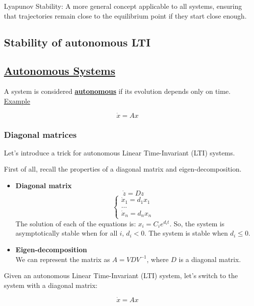 Lyapunov Stability: A more general concept applicable to all systems, ensuring that trajectories remain close to the equilibrium point if they start close enough.



\subsection{Stability of autonomous LTI}

\subsection*{\underline{Autonomous Systems}}

A system is considered \underline{\textbf{autonomous}} if its evolution depends only on time.\\

\underline{Example}

\[
\dot{x} = Ax
\]

\subsubsection{Diagonal matrices}

Let's introduce a trick for autonomous Linear Time-Invariant (LTI) systems.

First of all, recall the properties of a diagonal matrix and eigen-decomposition.
\begin{itemize}
    \item \textbf{Diagonal matrix}
        \[\dot{z} = Dz\]
        \[
        \begin{cases}
            \dot{x}_1 = d_1 x_1 \\
            \dots \\
            \dot{x}_n = d_n x_n
        \end{cases}
        \]
        The solution of each of the equations is: \(x_i = C_i e^{d_i t}\).
        So, the system is asymptotically stable when for all \(i\), \(d_i < 0\). 
        The system is stable when \(d_i \leq 0\).
    \item \textbf{Eigen-decomposition}\\
        We can represent the matrix as \(A = VDV^{-1}\), where \(D\) is a diagonal matrix.
\end{itemize}

Given an autonomous Linear Time-Invariant (LTI) system, let's switch to the system with a diagonal matrix:

\[
\dot{x} = Ax
\]

